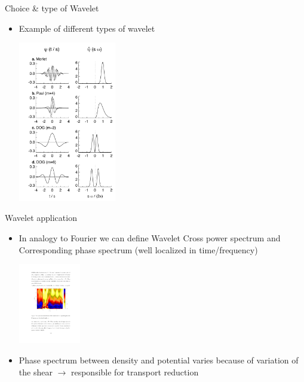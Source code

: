 \documentclass[t,10pt]{beamer}
\begin{document}
\begin{frame}{Choice \& type of Wavelet}
\begin{itemize}
\item Example of different types of wavelet \parencite{Mallat:1999te}
\begin{center}
\includegraphics[height=7cm]{various_wavelet}
\end{center}
\end{itemize}

\end{frame}


\begin{frame}{Wavelet application}
\begin{itemize}
\item In analogy to Fourier we can define Wavelet Cross power spectrum
  and Corresponding phase spectrum (well localized in time/frequency)

\begin{center}
\includegraphics[height=3.5cm]{wavelet-phase}
\end{center}

\item Phase spectrum between density and potential varies because of
  variation of the shear $\rightarrow$ responsible for transport
  reduction {\footnotesize\parencite{Antoni:2000bn}}

\end{itemize}
\end{frame}
\end{document}
